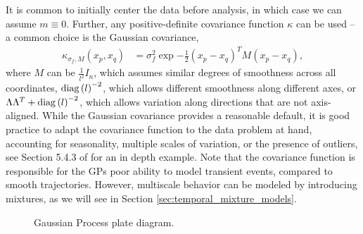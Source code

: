 \documentclass[14pt]{extarticle}
\begin{document}
It is common to initially center the data before analysis, in which case we can
assume $m \equiv 0$. Further, any positive-definite covariance function $\kappa$
can be used -- a common choice is the Gaussian covariance,
\begin{align*}
\kappa_{\sigma_{f}, M}\left(x_{p}, x_{q}\right) &= \sigma_{f}^{2}\exp{-\frac{1}{2}\left(x_{p} - x_{q}\right)^{T}M\left(x_{p} - x_{q}\right)},
\end{align*}
where $M$ can be $\frac{1}{l^{2}}I_{n}$, which assumes similar degrees of
smoothness across all coordinates, $\mathop\mathrm{diag}\left(l\right)^{-2}$, which allows
different smoothness along different axes, or $\Lambda \Lambda^{T} +
\mathop\mathrm{diag}\left(l\right)^{-2}$, which allows variation along directions that are not
axis-aligned. While the Gaussian covariance provides a reasonable default, it is
good practice to adapt the covariance function to the data problem at hand,
accounting for seasonality, multiple scales of variation, or the presence of
outliers, see Section 5.4.3 of \citep{rasmussen2006gaussian} for an in depth
example. Note that the covariance function is responsible for the GPs poor
ability to model transient events, compared to smooth trajectories. However,
multiscale behavior can be modeled by introducing mixtures, as we will see in
Section \ref{sec:temporal_mixture_models}.

\begin{figure}
  \centering

  \caption{Gaussian Process plate diagram.\label{fig:gp_plate} }
\end{figure}
\end{document}
